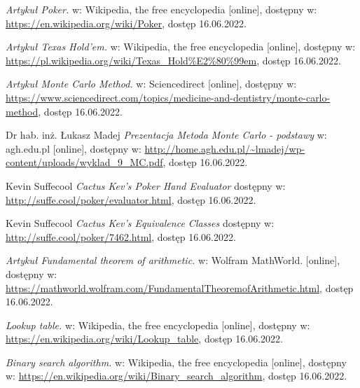 \documentclass[shortabstract, inz]{iithesis}
\author         {Bartosz Putek}
\date          {23 czerwca 2022}                     %
\begin{document}













\begin{thebibliography}{1}
\textit{Artykuł Poker.} 
w: Wikipedia, the free encyclopedia [online], dostępny w:
\url{https://en.wikipedia.org/wiki/Poker},
dostęp 16.06.2022.

\textit{Artykuł Texas Hold’em.} 
w: Wikipedia, the free encyclopedia [online], dostępny w:
\url{https://pl.wikipedia.org/wiki/Texas_Hold%E2%80%99em},
dostęp 16.06.2022.

\textit{Artykuł Monte Carlo Method.} 
w: Sciencedirect [online], dostępny w:
\url{https://www.sciencedirect.com/topics/medicine-and-dentistry/monte-carlo-method},
dostęp 16.06.2022.

Dr hab. inż. Łukasz Madej
\textit{Prezentacja Metoda Monte Carlo - podstawy} 
w: agh.edu.pl [online], dostępny w:
\url{http://home.agh.edu.pl/~lmadej/wp-content/uploads/wyklad_9_MC.pdf},
dostęp 16.06.2022.

Kevin Suffecool
\textit{Cactus Kev's Poker Hand Evaluator} 
dostępny w:
\url{http://suffe.cool/poker/evaluator.html},
dostęp 16.06.2022.

Kevin Suffecool
\textit{Cactus Kev's Equivalence Classes} 
dostępny w:
\url{http://suffe.cool/poker/7462.html},
dostęp 16.06.2022.

\textit{Artykuł Fundamental theorem of arithmetic.} 
w: Wolfram MathWorld. [online], dostępny w:
\url{https://mathworld.wolfram.com/FundamentalTheoremofArithmetic.html},
dostęp 16.06.2022.

\textit{Lookup table.} 
w: Wikipedia, the free encyclopedia [online], dostępny w:
\url{https://en.wikipedia.org/wiki/Lookup_table},
dostęp 16.06.2022.

\textit{Binary search algorithm.} 
w: Wikipedia, the free encyclopedia [online], dostępny w:
\url{https://en.wikipedia.org/wiki/Binary_search_algorithm},
dostęp 16.06.2022.


\end{thebibliography}
\end{document}
